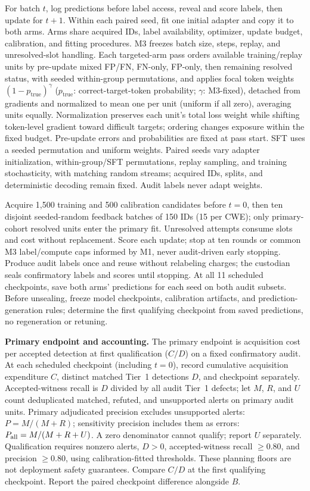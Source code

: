 \documentclass[11pt]{article}
\begin{document}
For batch $t$, log predictions before label access, reveal and score labels, then update for $t{+}1$. Within each paired seed, fit one initial adapter and copy it to both arms. Arms share acquired IDs, label availability, optimizer, update budget, calibration, and fitting procedures. M3 freezes batch size, steps, replay, and unresolved-slot handling. Each targeted-arm pass orders available training/replay units by pre-update mixed FP/FN, FN-only, FP-only, then remaining resolved status, with seeded within-group permutations, and applies focal token weights $(1-p_{\mathrm{true}})^\gamma$ ($p_{\mathrm{true}}$: correct-target-token probability; $\gamma$: M3-fixed), detached from gradients and normalized to mean one per unit (uniform if all zero), averaging units equally. Normalization preserves each unit's total loss weight while shifting token-level gradient toward difficult targets; ordering changes exposure within the fixed budget. Pre-update errors and probabilities are fixed at pass start. SFT uses a seeded permutation and uniform weights. Paired seeds vary adapter initialization, within-group/SFT permutations, replay sampling, and training stochasticity, with matching random streams; acquired IDs, splits, and deterministic decoding remain fixed. Audit labels never adapt weights.

Acquire 1,500 training and 500 calibration candidates before $t=0$, then ten disjoint seeded-random feedback batches of 150 IDs (15 per CWE); only primary-cohort resolved units enter the primary fit. Unresolved attempts consume slots and cost without replacement. Score each update; stop at ten rounds or common M3 label/compute caps informed by M1, never audit-driven early stopping. Produce audit labels once and reuse without relabeling charges; the custodian seals confirmatory labels and scores until stopping. At all 11 scheduled checkpoints, save both arms' predictions for each seed on both audit subsets. Before unsealing, freeze model checkpoints, calibration artifacts, and prediction-generation rules; determine the first qualifying checkpoint from saved predictions, no regeneration or retuning.

\textbf{Primary endpoint and accounting.} The primary endpoint is acquisition cost per accepted detection at first qualification ($C/D$) on a fixed confirmatory audit. At each scheduled checkpoint (including $t=0$), record cumulative acquisition expenditure $C$, distinct matched Tier~1 detections $D$, and checkpoint separately. Accepted-witness recall is $D$ divided by all audit Tier~1 defects; let $M$, $R$, and $U$ count deduplicated matched, refuted, and unsupported alerts on primary audit units. Primary adjudicated precision excludes unsupported alerts: $P=M/(M+R)$; sensitivity precision includes them as errors: $P_{\rm all}=M/(M+R+U)$. A zero denominator cannot qualify; report $U$ separately. Qualification requires nonzero alerts, $D>0$, accepted-witness recall $\geq0.80$, and precision $\geq0.80$, using calibration-fitted thresholds. These planning floors are not deployment safety guarantees. Compare $C/D$ at the first qualifying checkpoint. Report the paired checkpoint difference alongside $B$.
\end{document}
